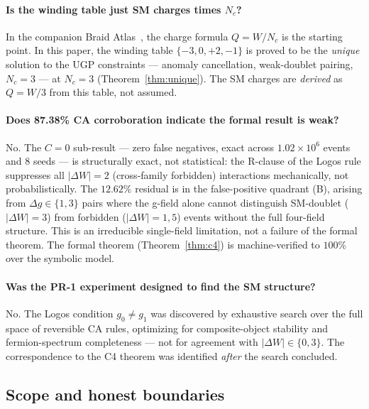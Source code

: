 \documentclass[12pt]{article}
\theoremstyle{remark}
\begin{document}
\paragraph{Is the winding table just SM charges times $N_c$?}
In the companion Braid Atlas~\cite{ugp-p17}, the charge formula $Q = W/N_c$
is the starting point.  In this paper, the winding table $\{-3,0,+2,-1\}$ is
proved to be the \emph{unique} solution to the UGP constraints --- anomaly
cancellation, weak-doublet pairing, $N_c = 3$ --- at $N_c = 3$
(Theorem~\ref{thm:unique}).  The SM charges are \emph{derived} as $Q = W/3$
from this table, not assumed.

\paragraph{Does 87.38\% CA corroboration indicate the formal result is weak?}
No.  The $C = 0$ sub-result --- zero false negatives, exact across $1.02
\times 10^6$ events and 8 seeds --- is structurally exact, not statistical: the
R-clause of the Logos rule suppresses all $|\Delta W| = 2$ (cross-family
forbidden) interactions mechanically, not probabilistically.  The $12.62\%$
residual is in the false-positive quadrant (B), arising from $\Delta g \in
\{1,3\}$ pairs where the g-field alone cannot distinguish SM-doublet
($|\Delta W|=3$) from forbidden ($|\Delta W|=1,5$) events without the full
four-field structure.  This is an irreducible single-field limitation, not a
failure of the formal theorem.  The formal theorem (Theorem~\ref{thm:c4}) is
machine-verified to $100\%$ over the symbolic model.

\paragraph{Was the PR-1 experiment designed to find the SM structure?}
No.  The Logos condition $g_0 \neq g_1$ was discovered by exhaustive search
over the full space of reversible CA rules, optimizing for composite-object
stability and fermion-spectrum completeness --- not for agreement with
$|\Delta W| \in \{0, 3\}$.  The correspondence to the C4 theorem was
identified \emph{after} the search concluded.

\subsection{Scope and honest boundaries}
\end{document}
